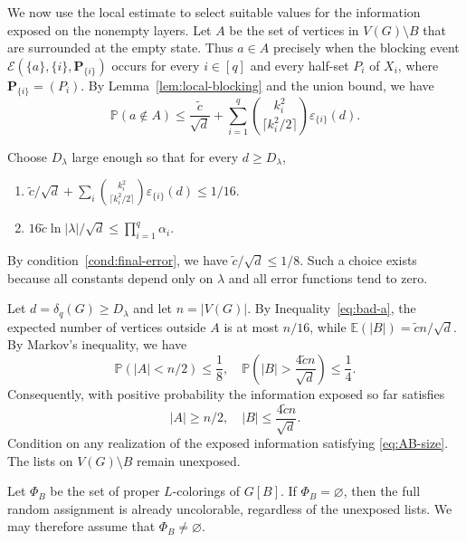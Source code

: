 \documentclass[10pt,a4paper]{amsart}
\numberwithin{equation}{section}
\newcommand{\Prob}{\mathbb{P}}
\newcommand{\Ex}{\mathbb{E}}
\begin{document}
We now use the local estimate to select suitable values for the information
exposed on the nonempty layers. Let $A$ be the set of vertices in
$V(G) \setminus B$ that are
surrounded at the empty state. Thus $a \in A$ precisely when the
blocking event $\mathcal{E}(\{a\},\{i\},\mathbf{P}_{\{i\}})$ occurs for every
$i \in [q]$ and every half-set $P_i$ of $X_i$, where
$\mathbf{P}_{\{i\}} = (P_i)$. By Lemma~\ref{lem:local-blocking} and the union
bound, we have
\begin{equation}\label{eq:bad-a}
 \Prob(a \notin A)
 \leq \frac{\widetilde{c}}{\sqrt{d}}
 +\sum_{i = 1}^q
 \binom{k_i^2}{\lceil k_i^2/2\rceil}
 \varepsilon_{\{i\}}(d).
\end{equation}

Choose $D_\lambda$ large enough so that for every $d \geq D_\lambda$,
\begin{enumerate}[label=(D\arabic*),ref=(D\arabic*),labelindent=2em,
	leftmargin=*, itemsep=0.5em,topsep=0.7em]
\item\label{cond:final-error} $\widetilde{c}/\sqrt{d}
+\sum_i\binom{k_i^2}{\lceil k_i^2/2\rceil}
\varepsilon_{\{i\}}(d) \leq 1/16$.
\item\label{cond:final-union} $16\widetilde{c}\ln |\lambda|/\sqrt{d}
 \leq \prod_{i = 1}^q \alpha_i$.
\end{enumerate}
By condition~\ref{cond:final-error}, we have
$\widetilde{c}/\sqrt{d} \leq 1/8$. Such a choice exists
because all constants depend only on $\lambda$ and all error functions tend
to zero.

Let $d = \delta_q(G) \geq D_\lambda$ and let $n = |V(G)|$. By
Inequality~\eqref{eq:bad-a}, the expected number of vertices outside $A$ is at
most $n/16$, while $\Ex(|B|) = \widetilde{c}n/\sqrt{d}$.
By Markov's inequality, we have
\[
 \Prob(|A| < n/2) \leq \frac{1}{8},
 \quad
 \Prob\left(|B| > \frac{4\widetilde{c}n}{\sqrt{d}}\right) \leq \frac{1}{4}.
\]
Consequently, with positive probability the information exposed so far satisfies
\begin{equation}\label{eq:AB-size}
 |A| \geq n/2,
 \quad
 |B| \leq \frac{4\widetilde{c}n}{\sqrt{d}}.
\end{equation}
Condition on any realization of the exposed information satisfying
\eqref{eq:AB-size}. The lists on
$V(G)\setminus B$ remain unexposed.

Let $\Phi_B$ be the set of proper $L$-colorings of $G[B]$.
If $\Phi_B = \varnothing$, then the full random assignment is already
uncolorable, regardless of the unexposed lists. We may therefore assume that
$\Phi_B \ne \varnothing$.
\end{document}
